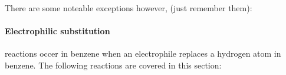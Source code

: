 	There are some noteable exceptions however, (just remember them):
	
	\begin{center}
	    \hspace{1.5cm}
	    \hspace{1.5cm}
	    
	    \vspace{2cm}
	\end{center}
	
	\paragraph{Electrophilic substitution} reactions occer in benzene when an electrophile replaces a hydrogen atom in benzene. The following reactions are covered in this section:
	
